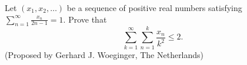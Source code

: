 Let $(x_1,x_2,\ldots)$ be a sequence of positive real numbers satisfying ${\displaystyle \sum_{n=1}^{\infty}\frac{x_n}{2n-1}=1}$. Prove that $$ \displaystyle \sum_{k=1}^{\infty} \sum_{n=1}^{k} \frac{x_n}{k^2} \le2. $$
(Proposed by Gerhard J. Woeginger, The Netherlands)